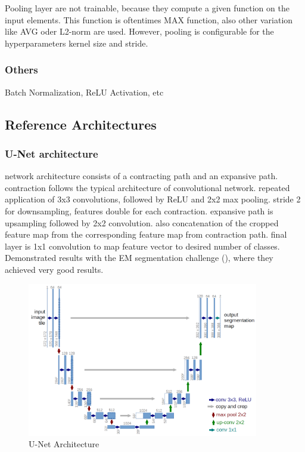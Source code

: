 Pooling layer are not trainable, because they compute a given function on the input elements. This function is oftentimes MAX function, also other variation like AVG oder L2-norm are used. However, pooling is configurable for the hyperparameters kernel size and stride.

\subsubsection{Others}
Batch Normalization, ReLU Activation, etc

\subsection{Reference Architectures}

\subsubsection{U-Net architecture}
\cite{unet15}
network architecture consists of a contracting path and an expansive path. contraction follows the typical architecture of convolutional network. repeated application of 3x3 convolutions, followed by ReLU and 2x2 max pooling. stride 2 for downsampling, features double for each contraction.
expansive path is upsampling followed by 2x2 convolution. also concatenation of the cropped feature map from the corresponding feature map from contraction path.
final layer is 1x1 convolution to map feature vector to desired number of classes. Demonstrated results with the EM segmentation challenge (\cite{isbi_challenge}), where they achieved very good results.

\begin{figure}[h]
    \centering
    \includegraphics[width=0.9\textwidth]{images/u-net-architecture}
    \caption{U-Net Architecture \cite{unet15}}
    \label{fig:unet_architecture}
\end{figure}

